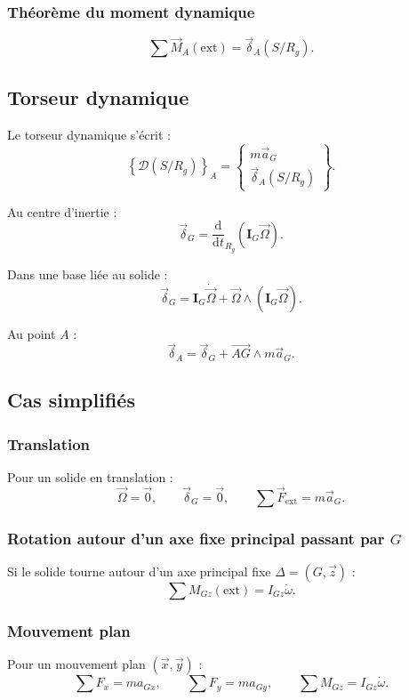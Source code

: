 \subsubsection{Théorème du moment dynamique}
\[
\sum\vec M_A(\mathrm{ext})=\vec\delta_A(S/R_g).
\]

\subsection{Torseur dynamique}

Le torseur dynamique s'écrit :
\[
\left\{\mathcal D(S/R_g)\right\}_A=
\left\{
\begin{array}{c}
m\vec a_G\\[1mm]
\vec\delta_A(S/R_g)
\end{array}
\right\}.
\]

Au centre d'inertie :
\[
\vec\delta_G=
\frac{\mathrm d}{\mathrm dt}_{R_g}
\left(\mathbf I_G\vec\Omega\right).
\]

Dans une base liée au solide :
\[
\vec\delta_G=\mathbf I_G\dot{\vec\Omega}
+\vec\Omega\wedge\left(\mathbf I_G\vec\Omega\right).
\]

Au point $A$ :
\[
\vec\delta_A=\vec\delta_G+\overrightarrow{AG}\wedge m\vec a_G.
\]

\subsection{Cas simplifiés}

\subsubsection{Translation}

Pour un solide en translation :
\[
\vec\Omega=\vec0,
\qquad
\vec\delta_G=\vec0,
\qquad
\sum\vec F_{\mathrm{ext}}=m\vec a_G.
\]

\subsubsection{Rotation autour d'un axe fixe principal passant par $G$}

Si le solide tourne autour d'un axe principal fixe $\Delta=(G,\vec z)$ :
\[
\sum M_{Gz}(\mathrm{ext})=I_{Gz}\dot\omega.
\]

\subsubsection{Mouvement plan}

Pour un mouvement plan $(\vec x,\vec y)$ :
\[
\sum F_x=m a_{Gx},
\qquad
\sum F_y=m a_{Gy},
\qquad
\sum M_{Gz}=I_{Gz}\dot\omega.
\]

